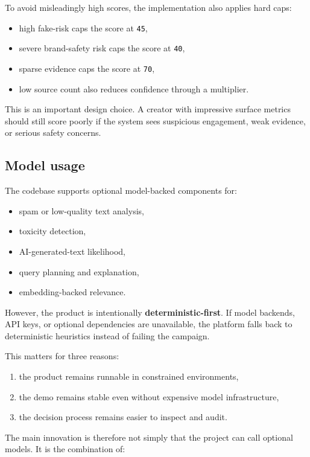 \documentclass[11pt,a4paper]{article}
\begin{document}
To avoid misleadingly high scores, the implementation also applies hard caps:

\begin{itemize}
  \item high fake-risk caps the score at \texttt{45},
  \item severe brand-safety risk caps the score at \texttt{40},
  \item sparse evidence caps the score at \texttt{70},
  \item low source count also reduces confidence through a multiplier.
\end{itemize}

This is an important design choice. A creator with impressive surface metrics should still score poorly if the system sees suspicious engagement, weak evidence, or serious safety concerns.

\subsection{Model usage}

The codebase supports optional model-backed components for:

\begin{itemize}
  \item spam or low-quality text analysis,
  \item toxicity detection,
  \item AI-generated-text likelihood,
  \item query planning and explanation,
  \item embedding-backed relevance.
\end{itemize}

However, the product is intentionally \textbf{deterministic-first}. If model backends, API keys, or optional dependencies are unavailable, the platform falls back to deterministic heuristics instead of failing the campaign.

This matters for three reasons:

\begin{enumerate}
  \item the product remains runnable in constrained environments,
  \item the demo remains stable even without expensive model infrastructure,
  \item the decision process remains easier to inspect and audit.
\end{enumerate}

The main innovation is therefore not simply that the project can call optional models. It is the combination of:
\end{document}
